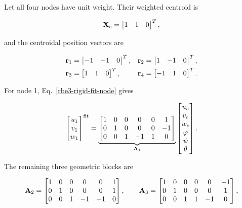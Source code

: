 Let all four nodes have unit weight. Their weighted centroid is

\begin{equation}
    \mathbf{X}_c=\begin{bmatrix}1&1&0\end{bmatrix}^{T},
\end{equation}

and the centroidal position vectors are

\begin{equation}
\begin{aligned}
    \mathbf{r}_1&=\begin{bmatrix}-1&-1&0\end{bmatrix}^{T}, &
    \mathbf{r}_2&=\begin{bmatrix} 1&-1&0\end{bmatrix}^{T},\\
    \mathbf{r}_3&=\begin{bmatrix} 1& 1&0\end{bmatrix}^{T}, &
    \mathbf{r}_4&=\begin{bmatrix}-1& 1&0\end{bmatrix}^{T}.
\end{aligned}
\end{equation}

For node 1, Eq.~\eqref{rbe3-rigid-fit-node} gives

\begin{equation}
\begin{bmatrix}u_1\\v_1\\w_1\end{bmatrix}^{\mathrm{fit}}
=
\underbrace{\begin{bmatrix}
1&0&0& 0& 0& 1\\
0&1&0& 0& 0&-1\\
0&0&1&-1& 1& 0
\end{bmatrix}}_{\mathbf{A}_1}
\begin{bmatrix}
 u_c\\v_c\\w_c\\\varphi\\\psi\\\theta
\end{bmatrix}.
\end{equation}

The remaining three geometric blocks are

\begin{equation}
\mathbf{A}_2=
\begin{bmatrix}
1&0&0& 0& 0& 1\\
0&1&0& 0& 0& 1\\
0&0&1&-1&-1& 0
\end{bmatrix},
\qquad
\mathbf{A}_3=
\begin{bmatrix}
1&0&0& 0& 0&-1\\
0&1&0& 0& 0& 1\\
0&0&1& 1&-1& 0
\end{bmatrix},
\end{equation}

